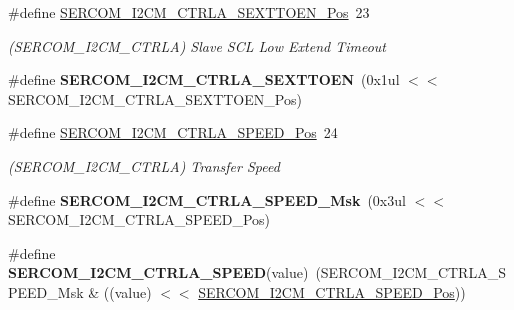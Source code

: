 \begin{DoxyCompactItemize}
\item 
\hypertarget{group___s_a_m_l21___s_e_r_c_o_m_ga7bf65052f4d40502890e3164c6aa2d72}{}\#define \hyperlink{group___s_a_m_l21___s_e_r_c_o_m_ga7bf65052f4d40502890e3164c6aa2d72}{S\+E\+R\+C\+O\+M\+\_\+\+I2\+C\+M\+\_\+\+C\+T\+R\+L\+A\+\_\+\+S\+E\+X\+T\+T\+O\+E\+N\+\_\+\+Pos}~23\label{group___s_a_m_l21___s_e_r_c_o_m_ga7bf65052f4d40502890e3164c6aa2d72}

\begin{DoxyCompactList}\small\item\em (S\+E\+R\+C\+O\+M\+\_\+\+I2\+C\+M\+\_\+\+C\+T\+R\+L\+A) Slave S\+C\+L Low Extend Timeout \end{DoxyCompactList}\item 
\hypertarget{group___s_a_m_l21___s_e_r_c_o_m_gab7402278ce9e474a1f554bc2d8d2d2e9}{}\#define {\bfseries S\+E\+R\+C\+O\+M\+\_\+\+I2\+C\+M\+\_\+\+C\+T\+R\+L\+A\+\_\+\+S\+E\+X\+T\+T\+O\+E\+N}~(0x1ul $<$$<$ S\+E\+R\+C\+O\+M\+\_\+\+I2\+C\+M\+\_\+\+C\+T\+R\+L\+A\+\_\+\+S\+E\+X\+T\+T\+O\+E\+N\+\_\+\+Pos)\label{group___s_a_m_l21___s_e_r_c_o_m_gab7402278ce9e474a1f554bc2d8d2d2e9}

\item 
\hypertarget{group___s_a_m_l21___s_e_r_c_o_m_ga1918dcf793b5c5e5771c8170cb5d0011}{}\#define \hyperlink{group___s_a_m_l21___s_e_r_c_o_m_ga1918dcf793b5c5e5771c8170cb5d0011}{S\+E\+R\+C\+O\+M\+\_\+\+I2\+C\+M\+\_\+\+C\+T\+R\+L\+A\+\_\+\+S\+P\+E\+E\+D\+\_\+\+Pos}~24\label{group___s_a_m_l21___s_e_r_c_o_m_ga1918dcf793b5c5e5771c8170cb5d0011}

\begin{DoxyCompactList}\small\item\em (S\+E\+R\+C\+O\+M\+\_\+\+I2\+C\+M\+\_\+\+C\+T\+R\+L\+A) Transfer Speed \end{DoxyCompactList}\item 
\hypertarget{group___s_a_m_l21___s_e_r_c_o_m_ga9e2f87a54eb9a5bf8fe4df55f362ff89}{}\#define {\bfseries S\+E\+R\+C\+O\+M\+\_\+\+I2\+C\+M\+\_\+\+C\+T\+R\+L\+A\+\_\+\+S\+P\+E\+E\+D\+\_\+\+Msk}~(0x3ul $<$$<$ S\+E\+R\+C\+O\+M\+\_\+\+I2\+C\+M\+\_\+\+C\+T\+R\+L\+A\+\_\+\+S\+P\+E\+E\+D\+\_\+\+Pos)\label{group___s_a_m_l21___s_e_r_c_o_m_ga9e2f87a54eb9a5bf8fe4df55f362ff89}

\item 
\hypertarget{group___s_a_m_l21___s_e_r_c_o_m_ga67406e698c6246c4ab6c4f915be721e8}{}\#define {\bfseries S\+E\+R\+C\+O\+M\+\_\+\+I2\+C\+M\+\_\+\+C\+T\+R\+L\+A\+\_\+\+S\+P\+E\+E\+D}(value)~(S\+E\+R\+C\+O\+M\+\_\+\+I2\+C\+M\+\_\+\+C\+T\+R\+L\+A\+\_\+\+S\+P\+E\+E\+D\+\_\+\+Msk \& ((value) $<$$<$ \hyperlink{group___s_a_m_l21___s_e_r_c_o_m_ga1918dcf793b5c5e5771c8170cb5d0011}{S\+E\+R\+C\+O\+M\+\_\+\+I2\+C\+M\+\_\+\+C\+T\+R\+L\+A\+\_\+\+S\+P\+E\+E\+D\+\_\+\+Pos}))\label{group___s_a_m_l21___s_e_r_c_o_m_ga67406e698c6246c4ab6c4f915be721e8}


\end{DoxyCompactItemize}
